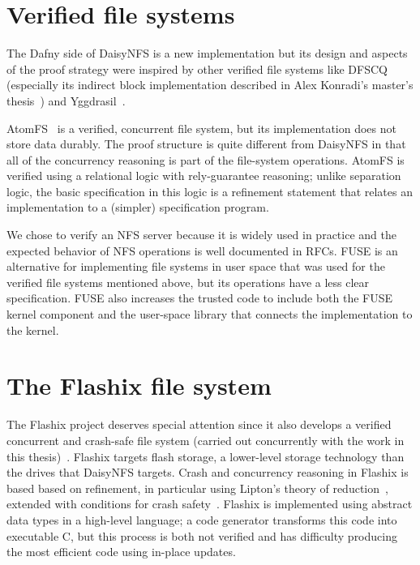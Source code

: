 \section{Verified file systems}
\label{sec:rel:verified-fs}

The Dafny side of DaisyNFS is a new implementation but its design and aspects of
the proof strategy were inspired by other verified file systems like
DFSCQ~\cite{chen:dfscq} (especially its indirect block implementation described
in Alex Konradi's master's thesis~\cite{akonradi-meng}) and
Yggdrasil~\cite{sigurbjarnarson:yggdrasil}.

AtomFS~\cite{zou:atomfs} is a verified, concurrent file system, but its
implementation does not store data durably. The proof structure is quite
different from DaisyNFS in that all of the concurrency reasoning is part of the
file-system operations. AtomFS is verified using a relational logic with rely-guarantee
reasoning; unlike separation logic, the basic specification in this logic is a
refinement statement that relates an implementation to a (simpler) specification
program.

We chose to verify an NFS server because it is widely used in practice and the
expected behavior of NFS operations is well documented in RFCs. FUSE is an
alternative for implementing file systems in user space that was used for the
verified file systems mentioned above, but its operations have a less clear
specification. FUSE also increases the trusted code to include both the FUSE
kernel component and the user-space library that connects the implementation to
the kernel.

\section{The Flashix file system}
\label{sec:rel:flashix}

The Flashix project deserves special attention since it also develops a verified
concurrent and crash-safe file system (carried out concurrently with the work in this thesis)~\cite{bodenmuller:concurrent-flashix}.
Flashix targets flash storage, a lower-level storage technology than the drives
that DaisyNFS targets. Crash and concurrency reasoning in Flashix is based based
on refinement, in particular using Lipton's theory of
reduction~\cite{lipton:movers}, extended with conditions for crash
safety~\cite[\S 13.3]{Pfaehler2018}. Flashix is implemented using abstract data
types in a high-level language; a code generator transforms this code into
executable C, but this process is both not verified and has difficulty producing
the most efficient code using in-place updates.

